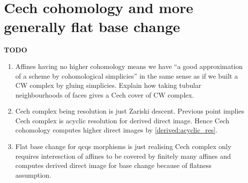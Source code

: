 \documentclass{article}
\begin{document}
\section{Cech cohomology and more generally flat base change}

\textbf{TODO}
\begin{enumerate}
  \item Affines having no higher cohomology
  means we have ``a good approximation of a scheme
  by cohomological simplicies'' in the same sense
  as if we built a CW complex by gluing simplicies.
  Explain how taking tubular neighbourhoods of faces gives
  a Cech cover of CW complex.
  \item Cech complex being resolution is just Zariski descent.
  Previous point implies Cech complex is
  acyclic resolution for derived direct image.
  Hence Cech cohomology computes higher direct images by 
  \ref{derived:acyclic_res}.
  \item Flat base change for qcqs morphisms is just realising
  Cech complex only requires interesction of affines to be 
  covered by finitely many affines and computes derived direct image
  for base change because of flatness assumption.
\end{enumerate}

\printbibliography
\end{document}
